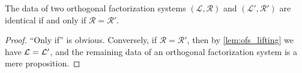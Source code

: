 \begin{cor}\label{lem:sofs_req}
The data of two orthogonal factorization systems $(\mathcal{L},\mathcal{R})$ and
$(\mathcal{L}',\mathcal{R}')$ are identical if and only if
$\mathcal{R}=\mathcal{R}'$.
\end{cor}
\begin{proof}
  ``Only if'' is obvious.
  Conversely, if $\mathcal{R}=\mathcal{R}'$, then by \cref{lem:ofs_lifting} we have $\mathcal{L} = \mathcal{L}'$, and the remaining data of an orthogonal factorization system is a mere proposition.
\end{proof}

\begin{comment}
\begin{lem}[Unfinished]
For each $l:X\to Y$ such that $\mathcal{L}(l)$ and each type $Z$, the function
\begin{equation*}
\lam{g} g\circ l: (\sm{g:Y\to Z}\mathcal{R}(g))\to(\sm{f:X\to Z}\mathcal{R}(f))
\end{equation*}
is a monomorphism. Also, for each $r:X\to Y$ such that $\mathcal{R}(r)$ and
each type $Z$, the function
\begin{equation*}
\lam{f} r\circ f : (\sm{f:Z\to X}\mathcal{L}(f))\to(\sm{g:Z\to Y}\mathcal{L}(g))
\end{equation*}
is a monomorphism.
\end{lem}

\begin{proof}
We prove the first statement. Suppose $g,g':Y\to Z$ are two $\mathcal{R}$-maps
such that $H:g\circ l=f$ and $H':g'\circ l=f$. Then we obtain two  ...
\end{proof}
\end{comment}

